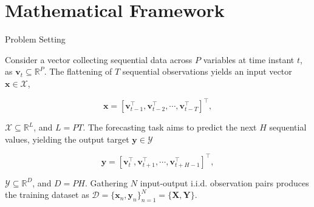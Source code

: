 \section{Mathematical Framework}

\begin{frame}{Problem Setting}

\begin{block}{}
	Consider a vector collecting sequential data across $P$ variables at time instant \( t \), as \( \boldsymbol{v}_t \subseteq \mathbb{R}^{P}\). The flattening of \( T \) sequential observations yields an input vector \( \boldsymbol{x} \in \mathcal{X} \),
\end{block}

\[ 
\boldsymbol{x}= [ \boldsymbol{v}_{t-1}^\top, \boldsymbol{v}_{t-2}^\top, \cdots, \boldsymbol{v}_{t-T}^\top  ]^\top,
\]

\begin{block}{}
	\( {\mathcal{X}} \subseteq \mathbb{R}^{L} \), and \( L = PT \). The forecasting task aims to predict the next \(H\) sequential values, yielding the output target \( \boldsymbol{y} \in {\mathcal{Y}} \)
\end{block}

\[
\boldsymbol{y} = [ \boldsymbol{v}_{t}^\top, \boldsymbol{v}_{t+1}^\top, \cdots, \boldsymbol{v}_{t+H-1}^\top  ]^\top,
\] 

\begin{block}{}
	\( {\mathcal{Y}} \subseteq \mathbb{R}^{D} \), and \( D = PH \). Gathering \( N \) input-output i.i.d. observation pairs produces the training dataset as \( {\mathcal{D}} = \{\boldsymbol{x}_n, \boldsymbol{y}_n\}_{n=1}^N = \{ \boldsymbol{X}, \boldsymbol{Y}\} \).
\end{block}

\end{frame}

